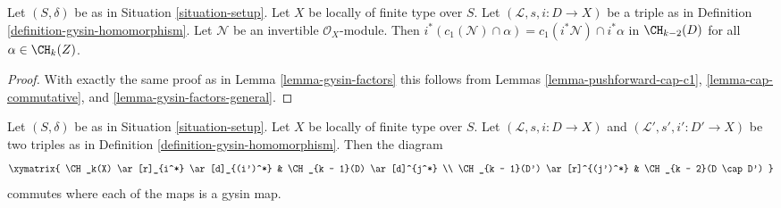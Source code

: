 \begin{lemma}
\label{lemma-gysin-commutes-cap-c1}
Let $(S, \delta)$ be as in Situation \ref{situation-setup}. Let $X$ be
locally of finite type over $S$. Let $(\mathcal{L}, s, i : D \to X)$
be a triple as in Definition \ref{definition-gysin-homomorphism}.
Let $\mathcal{N}$ be an invertible $\mathcal{O}_X$-module.
Then $i^*(c_1(\mathcal{N}) \cap \alpha) = c_1(i^*\mathcal{N}) \cap i^*\alpha$
in $\CH_{k - 2}(D)$ for all $\alpha \in \CH_k(Z)$.
\end{lemma}

\begin{proof}
With exactly the same proof as in Lemma \ref{lemma-gysin-factors}
this follows from Lemmas
\ref{lemma-pushforward-cap-c1},
\ref{lemma-cap-commutative}, and
\ref{lemma-gysin-factors-general}.
\end{proof}

\begin{lemma}
\label{lemma-gysin-commutes-gysin}
Let $(S, \delta)$ be as in Situation \ref{situation-setup}. Let $X$ be locally
of finite type over $S$. Let $(\mathcal{L}, s, i : D \to X)$ and
$(\mathcal{L}', s', i' : D' \to X)$ be two triples as in
Definition \ref{definition-gysin-homomorphism}. Then the diagram
$$
\xymatrix{
\CH_k(X) \ar[r]_{i^*} \ar[d]_{(i')^*} & \CH_{k - 1}(D) \ar[d]^{j^*} \\
\CH_{k - 1}(D') \ar[r]^{(j')^*} & \CH_{k - 2}(D \cap D')
}
$$
commutes where each of the maps is a gysin map.
\end{lemma}

